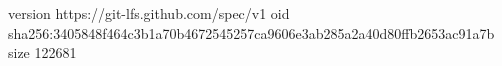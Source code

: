 version https://git-lfs.github.com/spec/v1
oid sha256:3405848f464c3b1a70b4672545257ca9606e3ab285a2a40d80ffb2653ac91a7b
size 122681
